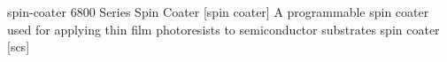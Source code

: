 \newglsXequipment%
{spin-coater}%
{6800 Series Spin Coater}%
[spin coater]%
{A programmable spin coater used for applying thin film photoresists to semiconductor substrates}%
{spin coater}%
[scs]%